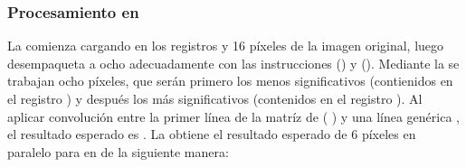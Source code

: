 \subsubsection{Procesamiento en }
	La   comienza cargando en los registros  y  16 píxeles de la imagen original, 
luego desempaqueta a ocho  adecuadamente con las instrucciones  () y  
(). Mediante la   se trabajan ocho píxeles, que serán primero los menos significativos 
(contienidos en el registro ) y después los más significativos (contenidos en el registro ). Al aplicar convolución entre la primer 
línea de la matríz de  ( 
) y una línea genérica 
, el resultado esperado es 
.
La   obtiene el resultado esperado de 6 píxeles en paralelo para  en  de la siguiente manera:

\begin{center}
\end{center}

